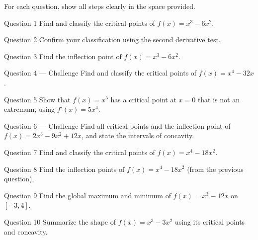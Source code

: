 \documentclass[11pt]{article}
\begin{document}
\clearpage
{}
For each question, show all steps clearly in the space provided.

\begin{qbox}{Question 1}
Find and classify the critical points of $f(x)=x^3-6x^2$.\workspace{2.4cm}
\end{qbox}

\begin{qbox}{Question 2}
Confirm your classification using the second derivative test.\workspace{2.4cm}
\end{qbox}

\begin{qbox}{Question 3}
Find the inflection point of $f(x)=x^3-6x^2$.\workspace{2.4cm}
\end{qbox}

\begin{qbox}{Question 4 --- Challenge}
Find and classify the critical points of $f(x)=x^4-32x$.\workspace{3.2cm}
\end{qbox}

\begin{qbox}{Question 5}
Show that $f(x)=x^5$ has a critical point at $x=0$ that is not an extremum, using $f'(x)=5x^4$.\workspace{2.4cm}
\end{qbox}

\begin{qbox}{Question 6 --- Challenge}
Find all critical points and the inflection point of $f(x)=2x^3-9x^2+12x$, and state the intervals of concavity.\workspace{3.6cm}
\end{qbox}

\begin{qbox}{Question 7}
Find and classify the critical points of $f(x)=x^4-18x^2$.\workspace{2.4cm}
\end{qbox}

\begin{qbox}{Question 8}
Find the inflection points of $f(x)=x^4-18x^2$ (from the previous question).\workspace{2.4cm}
\end{qbox}

\begin{qbox}{Question 9}
Find the global maximum and minimum of $f(x)=x^3-12x$ on $[-3,4]$.\workspace{2.4cm}
\end{qbox}

\begin{qbox}{Question 10}
Summarize the shape of $f(x)=x^3-3x^2$ using its critical points and concavity.\workspace{2.4cm}
\end{qbox}
\end{document}
